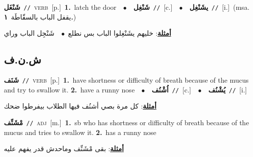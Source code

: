 \documentclass[10pt,a4paper,twoside]{article} %
\begin{document}
\begin{multicols}{2}
{\setlength\topsep{0pt}\textbf{\foreignlanguage{arabic}{شَنْغَل}}\ {\color{gray}\texttt{//}\color{black}}\ \textsc{verb}\ [p.]\ \textbf{1.}~latch the door\ \ $\bullet$\ \ \setlength\topsep{0pt}\textbf{\foreignlanguage{arabic}{شَنْغِل}}\ {\color{gray}\texttt{//}\color{black}}\ [c.]\ \ $\bullet$\ \ \setlength\topsep{0pt}\textbf{\foreignlanguage{arabic}{يشَنْغِل}}\ {\color{gray}\texttt{//}\color{black}}\ [i.]\ \color{gray}(msa. \foreignlanguage{arabic}{يقفل الباب بالسقّاطَة}~\foreignlanguage{arabic}{\textbf{١.}})\color{black}\  \begin{flushright}\color{gray}\foreignlanguage{arabic}{\textbf{\underline{\foreignlanguage{arabic}{أمثلة}}}: خليهم يشَنْغِلوا الباب بس نطلع\ $\bullet$\ \  شَنْجِل الباب وراي}\end{flushright}\color{black}} \vspace{2mm}

\vspace{-3mm}
\subsection*{\color{blue}\foreignlanguage{arabic}{ش.ن.ف}\color{blue}{}} 

{\setlength\topsep{0pt}\textbf{\foreignlanguage{arabic}{شَنَف}}\ {\color{gray}\texttt{//}\color{black}}\ \textsc{verb}\ [p.]\ \textbf{1.}~have shortness or difficulty of breath because of the mucus and try to swallow it.  \textbf{2.}~have a runny nose\ \ $\bullet$\ \ \setlength\topsep{0pt}\textbf{\foreignlanguage{arabic}{اُشْنُف}}\ {\color{gray}\texttt{//}\color{black}}\ [c.]\ \ $\bullet$\ \ \setlength\topsep{0pt}\textbf{\foreignlanguage{arabic}{يُشْنُف}}\ {\color{gray}\texttt{//}\color{black}}\ [i.]\  \begin{flushright}\color{gray}\foreignlanguage{arabic}{\textbf{\underline{\foreignlanguage{arabic}{أمثلة}}}: كل مرة بصي أشنُف فيها الطلاب بيفرطوا ضحك}\end{flushright}\color{black}} \vspace{2mm}

{\setlength\topsep{0pt}\textbf{\foreignlanguage{arabic}{مْشَنِّف}}\ {\color{gray}\texttt{//}\color{black}}\ \textsc{adj}\ [m.]\ \textbf{1.}~sb who has shortness or difficulty of breath because of the mucus and tries to swallow it.  \textbf{2.}~has a runny nose\  \begin{flushright}\color{gray}\foreignlanguage{arabic}{\textbf{\underline{\foreignlanguage{arabic}{أمثلة}}}: بقى مْشَنِّف وماحدش قدر يفهم عليه}\end{flushright}\color{black}} \vspace{2mm}


\end{multicols}
\end{document}
